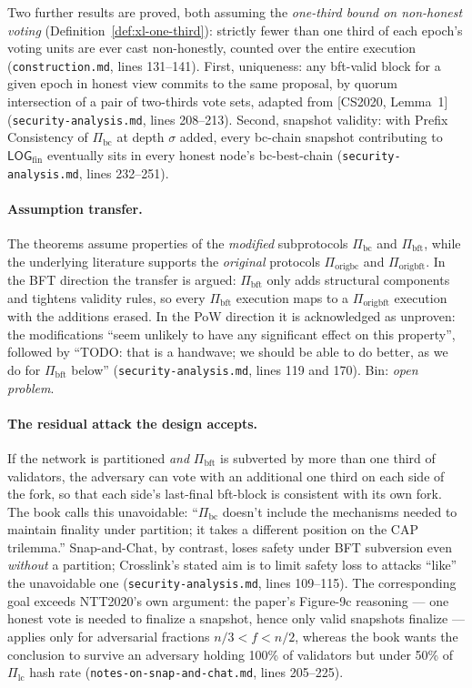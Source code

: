 \documentclass[11pt,a4paper]{article}
\theoremstyle{definition}
\begin{document}
Two further results are proved, both assuming the \emph{one-third bound
on non-honest voting} (Definition~\ref{def:xl-one-third}): strictly
fewer than one third of each epoch's voting
units are ever cast non-honestly, counted over the entire execution
(\texttt{construction.md}, lines 131--141). First, uniqueness: any
bft-valid block for a given epoch in honest view commits to the same
proposal, by quorum intersection of a pair of two-thirds vote sets, adapted from
[CS2020, Lemma~1] (\texttt{security-analysis.md}, lines 208--213). Second,
snapshot validity: with Prefix Consistency of $\Pi_{\mathrm{bc}}$ at depth
$\sigma$ added, every bc-chain snapshot contributing to
$\mathsf{LOG}_{\mathrm{fin}}$ eventually sits in every honest node's
bc-best-chain (\texttt{security-analysis.md}, lines 232--251).

\paragraph{Assumption transfer.} The theorems assume properties of the
\emph{modified} subprotocols $\Pi_{\mathrm{bc}}$ and $\Pi_{\mathrm{bft}}$,
while the underlying literature supports the \emph{original} protocols
$\Pi_{\mathrm{origbc}}$ and $\Pi_{\mathrm{origbft}}$. In the BFT
direction the transfer is argued: $\Pi_{\mathrm{bft}}$ only adds
structural components and tightens validity rules, so every
$\Pi_{\mathrm{bft}}$ execution maps to a $\Pi_{\mathrm{origbft}}$
execution with the additions erased. In the PoW direction it is
acknowledged as unproven: the modifications ``seem unlikely to have any
significant effect on this property'', followed by ``TODO: that is a
handwave; we should be able to do better, as we do for
$\Pi_{\mathrm{bft}}$ below'' (\texttt{security-analysis.md}, lines 119 and
170). Bin: \emph{open problem}.

\paragraph{The residual attack the design accepts.} If the network is
partitioned \emph{and} $\Pi_{\mathrm{bft}}$ is subverted by more than one
third of validators, the adversary can vote with an additional one third
on each side of the fork, so that each side's last-final bft-block is
consistent with its own fork. The book calls this unavoidable:
``$\Pi_{\mathrm{bc}}$ doesn't include the mechanisms needed to maintain
finality under partition; it takes a different position on the CAP
trilemma.'' Snap-and-Chat, by contrast, loses safety under BFT subversion
even \emph{without} a partition; Crosslink's stated aim is to limit safety
loss to attacks ``like'' the unavoidable one
(\texttt{security-analysis.md}, lines 109--115). The corresponding goal
exceeds NTT2020's own argument: the paper's Figure-9c reasoning --- one
honest vote is needed to finalize a snapshot, hence only valid snapshots
finalize --- applies only for adversarial fractions $n/3 < f < n/2$,
whereas the book wants the conclusion to survive an adversary holding
100\% of validators but under 50\% of $\Pi_{\mathrm{lc}}$ hash rate
(\texttt{notes-on-snap-and-chat.md}, lines 205--225).
\end{document}
